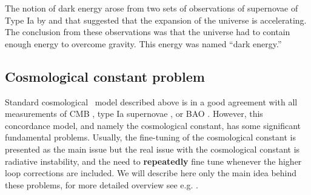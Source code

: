 The notion of dark energy arose from two sets of observations of supernovae of Type Ia by \textcite{riess} and \textcite{1999ApJ...517..565P} that suggested that the expansion of the universe is accelerating. The conclusion from these observations was that the universe had to contain enough energy to overcome gravity. This energy was named “dark energy.”

\subsection{Cosmological constant problem}
\label{ssec:lambda}
Standard cosmological \LCDM\ model described above is in a good agreement with all measurements of CMB \parencite{planck_cosm}, type Ia supernovae \parencite{Abbott_2019}, or BAO \parencite{BAO_results}. However, this concordance model, and namely the cosmological constant, has some significant fundamental problems. Usually, the fine-tuning of the cosmological constant is presented as the main issue but the real issue with the cosmological constant is radiative instability, and the need to \textbf{repeatedly} fine tune whenever the higher loop corrections are included. We will describe here only the main idea behind these problems, for more detailed overview see e.g. \textcite{2015arXiv150205296P,2012CRPhy..13..566M}.

